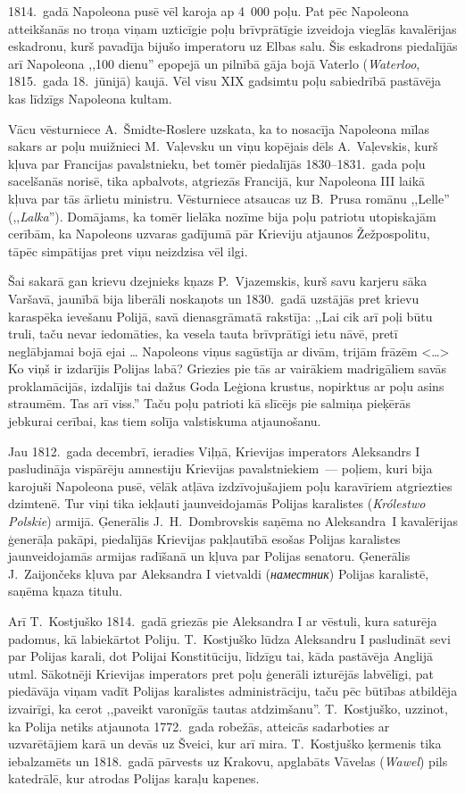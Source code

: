 \documentclass[twoside,a5paper,12pt,fleqn,openany]{extbook}
\newcommand{\pltxti}[1]{\textit{\textpolish{#1}}}
\newcommand{\rutxti}[1]{\textit{\textrussian{#1}}}
\newcommand{\entxti}[1]{\textit{\textenglish{#1}}}
\newcommand{\citespace}{<\dots{}>}
\begin{document}
1814.~gadā Napoleona pusē vēl karoja ap 4~000 poļu. Pat pēc Napoleona atteikšanās no troņa viņam uzticīgie poļu brīvprātīgie izveidoja vieglās kavalērijas eskadronu, kurš pavadīja bijušo imperatoru uz Elbas salu. Šis eskadrons piedalījās arī Napoleona ,,100 dienu'' epopejā un pilnībā gāja bojā Vaterlo (\entxti{Waterloo}, 1815.~gada 18.~jūnijā) kaujā. Vēl visu XIX gadsimtu poļu sabiedrībā pastāvēja kas līdzīgs Napoleona kultam.

Vācu vēsturniece A.~Šmidte-Roslere uzskata, ka to nosacīja Napoleona mīlas sakars ar poļu muižnieci M.~Vaļevsku un viņu kopējais dēls A.~Vaļevskis, kurš kļuva par Francijas pavalstnieku, bet tomēr piedalījās 1830--1831.~gada poļu sacelšanās norisē, tika apbalvots, atgriezās Francijā, kur Napoleona III laikā kļuva par tās ārlietu ministru. Vēsturniece atsaucas uz B.~Prusa romānu ,,Lelle'' (,,\pltxti{Lalka}''). Domājams, ka tomēr lielāka nozīme bija poļu patriotu utopiskajām cerībām, ka Napoleons uzvaras gadījumā pār Krieviju atjaunos Žežpospolitu, tāpēc simpātijas pret viņu neizdzisa vēl ilgi.

Šai sakarā gan krievu dzejnieks kņazs P.~Vjazemskis, kurš savu karjeru sāka Varšavā, jaunībā bija liberāli noskaņots un 1830.~gadā uzstājās pret krievu karaspēka ievešanu Polijā, savā dienasgrāmatā rakstīja: ,,Lai cik arī poļi būtu truli, taču nevar iedomāties, ka vesela tauta brīvprātīgi ietu nāvē, pretī neglābjamai bojā ejai \dots{} Napoleons viņus sagūstīja ar divām, trijām frāzēm \citespace{} Ko viņš ir izdarījis Polijas labā? Griezies pie tās ar vairākiem madrigāliem savās proklamācijās, izdalījis tai dažus Goda Leģiona krustus, nopirktus ar poļu asins straumēm. Tas arī viss.'' Taču poļu patrioti kā slīcējs pie salmiņa pieķērās jebkurai cerībai, kas tiem solīja valstiskuma atjaunošanu.

Jau 1812.~gada decembrī, ieradies Viļņā, Krievijas imperators Aleksandrs I pasludināja vispārēju amnestiju Krievijas pavalstniekiem~--- poļiem, kuri bija karojuši Napoleona pusē, vēlāk atļāva izdzīvojušajiem poļu karavīriem atgriezties dzimtenē. Tur viņi tika iekļauti jaunveidojamās Polijas karalistes (\pltxti{Królestwo Polskie}) armijā. Ģenerālis J.~H.~Dombrovskis saņēma no Aleksandra~I kavalērijas ģenerāļa pakāpi, piedalījās Krievijas pakļautībā esošas Polijas karalistes jaunveidojamās armijas radīšanā un kļuva par Polijas senatoru. Ģenerālis J.~Zaijončeks kļuva par Aleksandra I vietvaldi (\rutxti{наместник}) Polijas karalistē, saņēma kņaza titulu.

Arī T.~Kostjuško 1814.~gadā griezās pie Aleksandra I ar vēstuli, kura saturēja padomus, kā labiekārtot Poliju. T.~Kostjuško lūdza Aleksandru I pasludināt sevi par Polijas karali, dot Polijai Konstitūciju, līdzīgu tai, kāda pastāvēja Anglijā utml. Sākotnēji Krievijas imperators pret poļu ģenerāli izturējās labvēlīgi, pat piedāvāja viņam vadīt Polijas karalistes administrāciju, taču pēc būtības atbildēja izvairīgi, ka cerot ,,paveikt varonīgās tautas atdzimšanu''. T.~Kostjuško, uzzinot, ka Polija netiks atjaunota 1772.~gada robežās, atteicās sadarboties ar uzvarētājiem karā un devās uz Šveici, kur arī mira. T.~Kostjuško ķermenis tika iebalzamēts un 1818.~gadā pārvests uz Krakovu, apglabāts Vāvelas (\pltxti{Wawel}) pils katedrālē, kur atrodas Polijas karaļu kapenes.
\end{document}
